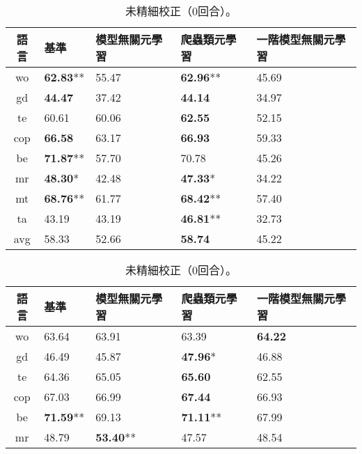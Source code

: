 \begin{table}[htbp]
    \begin{subtable}[h]{0.8\textwidth}
        \centering
            \begin{tabular}[!ht]{c|llll}
                \hline
                語言 & 基準 & 模型無關元學習 & 爬蟲類元學習 & 一階模型無關元學習 \\
                \hline\hline
                wo & \textbf{62.83}** & 55.47 & \textbf{62.96}** & 45.69 \\
                gd & \textbf{44.47} & 37.42 & \textbf{44.14} & 34.97 \\
                te & 60.61 & 60.06 & \textbf{62.55} & 52.15 \\
                cop & \textbf{66.58} & 63.17 & \textbf{66.93} & 59.33 \\
                be & \textbf{71.87}** & 57.70 & 70.78 & 45.26 \\
                mr & \textbf{48.30}* & 42.48 & \textbf{47.33}* & 34.22 \\
                mt & \textbf{68.76}** & 61.77 & \textbf{68.42}** & 57.40 \\
                ta & 43.19 & 43.19 & \textbf{46.81}** & 32.73 \\
                \hline
                avg & 58.33 & 52.66 & \textbf{58.74} & 45.22 \\
                \hline
            \end{tabular}
            \caption{未精細校正（0回合）。}
    \end{subtable}
    \vfill
    \begin{subtable}[h]{0.8\textwidth}
        \centering
            \begin{tabular}[!ht]{c|llll}
                \hline
                語言 & 基準 & 模型無關元學習 & 爬蟲類元學習 & 一階模型無關元學習 \\
                \hline\hline
                wo & 63.64 & 63.91 & 63.39 & \textbf{64.22} \\
                gd & 46.49 & 45.87 & \textbf{47.96}* & 46.88 \\
                te & 64.36 & 65.05 & \textbf{65.60} & 62.55 \\
                cop & 67.03 & 66.99 & \textbf{67.44} & 66.93 \\
                be & \textbf{71.59}** & 69.13 & \textbf{71.11}** & 67.99 \\
                mr & 48.79 & \textbf{53.40}** & 47.57 & 48.54 \\

\end{tabular}
\end{subtable}
\end{table}
